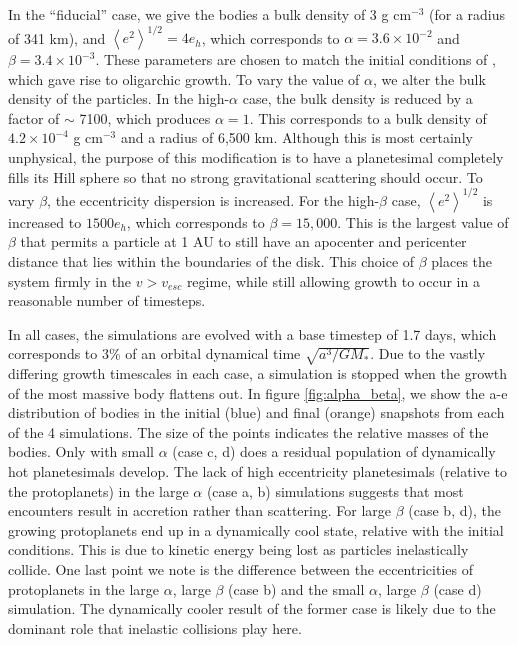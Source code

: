 In the ``fiducial'' case, we give the bodies a bulk density of 3 g
cm$^{-3}$ (for a radius of 341 km), and $\left< e^{2} \right>^{1/2} = 4 e_{h}$, which corresponds to $\alpha = 3.6 \times 10^{-2}$ and $\beta = 3.4 \times 10^{-3}$. These parameters are chosen to match the initial conditions of \cite{kokubo98}, which gave rise to oligarchic growth. 
To vary the value of $\alpha$, we alter the bulk density of the particles. In the high-$\alpha$ case, the bulk density is reduced by 
a factor of $\sim$ 7100, which produces $\alpha = 1$. This corresponds to a bulk density of $4.2 \times 10^{-4}$ g cm$^{-3}$ and a radius of 6,500 km. 
Although this is most certainly unphysical, the purpose of this modification is to have a planetesimal completely fills its Hill sphere so that no strong 
gravitational scattering should occur. To vary $\beta$, the eccentricity dispersion is increased. For the high-$
\beta$ case, $\left< e^{2} \right>^{1/2}$ is increased to $1500 e_{h}$, which corresponds to $\beta = 15,000$. This is the largest value of $\beta$ that permits a particle at 1 AU to still have an apocenter and pericenter distance that lies within the boundaries of the disk. This choice of $\beta$ places the system firmly in the $v > v_{esc}$ regime, while still allowing growth to occur in a reasonable number of timesteps.

In all cases, the simulations are evolved with a base timestep of 1.7
days, which corresponds to 3\% of an orbital dynamical time
$\sqrt{a^3/G M_{*}}$. Due to the vastly differing growth timescales in
each case, a simulation is stopped when the growth of the most massive
body flattens out. In figure \ref{fig:alpha_beta}, we show the a-e
distribution of bodies in the initial (blue) and final (orange)
snapshots from each of the 4 simulations. The size of the points
indicates the relative masses of the bodies. Only with small
$\alpha$ (case c, d) does a residual population of dynamically hot planetesimals
develop. The lack of high eccentricity planetesimals (relative to the protoplanets) in the large
$\alpha$ (case a, b) simulations suggests that most encounters result in accretion
rather than scattering. For large $\beta$ (case b, d), the growing protoplanets
end up in a dynamically cool state,
relative with the initial conditions. This is due to kinetic energy 
being lost as particles inelastically collide. One last point we note
is the difference between the eccentricities of protoplanets in the 
large $\alpha$, large $\beta$ (case b) and the small $\alpha$,
large $\beta$ (case d) simulation. The dynamically cooler result of the former case
is likely due to the dominant role that inelastic collisions play here.

